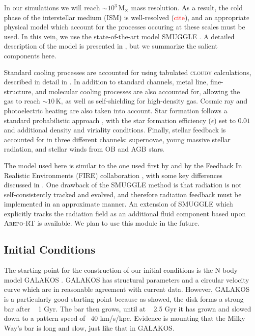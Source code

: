 \documentclass[a4paper,fleqn,usenatbib]{mnras}
\newcommand{\Msun}{\ensuremath{\text{M}_{\odot}}}
\newcommand{\areport}{\textsc{Arepo-RT}}
\newcommand{\smuggle}{\textsc{SMUGGLE}}
\begin{document}
In our simulations we will reach $\sim10^3\,\Msun$ mass resolution. As a
result, the cold phase of the interstellar medium (ISM) is well-resolved
(\textcolor{red}{cite}), and an appropriate physical model which account for
the processes occuring at these scales must be used. In this vein, we use the
state-of-the-art model \smuggle{} \citep{2019MNRAS.489.4233M}. A detailed
description of the model is presented in \citet{2019MNRAS.489.4233M}, but we
summarize the salient components here.

Standard cooling processes are accounted for using tabulated \textsc{cloudy}
calculations, described in detail in \citet{2013MNRAS.436.3031V}. In addition
to standard channels, metal line, fine-structure, and molecular cooling
processes are also accounted for, allowing the gas to reach
$\sim10\,\text{K}$, as well as self-shielding for high-density gas. Cosmic ray
and photoelectric heating are also taken into account. Star formation follows
a standard probabilistic approach \citep{2003MNRAS.339..289S}, with the star
formation efficiency ($\epsilon$) set to $0.01$ and additional density and
viriality conditions. Finally, stellar feedback is accounted for in three
different channels: supernovae, young massive stellar radiation, and stellar
winds from OB and AGB stars.

The model used here is similar to the one used first by
\citet{2011MNRAS.410.1391A, 2013ApJ...770...25A} and by the Feedback In
Realistic Environments (FIRE) collaboration \citep{2011MNRAS.417..950H,
2014MNRAS.445..581H, 2018MNRAS.480..800H}, with some key differences discussed
in \citet{2019MNRAS.489.4233M}. One drawback of the \smuggle{} method is that
radiation is not self-consistently tracked and evolved, and therefore
radiation feedback must be implemented in an approximate manner. An extension
of \smuggle{} which explicitly tracks the radiation field as an additional
fluid component \citep{2019arXiv191014041K} based upon \areport{}
\citep{2019MNRAS.485..117K} is available. We plan to use this module in the
future.

\subsection{Initial Conditions}
The starting point for the construction of our initial conditions is the
N-body model GALAKOS \citep{2020ApJ...890..117D}. GALAKOS has structural
parameters and a circular velocity curve which are in reasonable agreement
with current data. However, GALAKOS is a particularly good starting point
because as \citet{2020ApJ...890..117D} showed, the disk forms a strong bar
after ~ 1 Gyr. The bar then grows, until at ~ 2.5 Gyr it has grown and slowed
down to a pattern speed of ~40 km/s/kpc. Evidence is mounting that the Milky
Way's bar is long and slow, just like that in GALAKOS.
\end{document}
